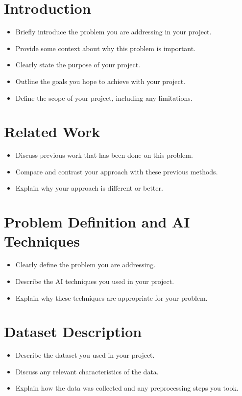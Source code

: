 \documentclass{article}
\begin{document}
\section{Introduction}
\begin{itemize}
    \item Briefly introduce the problem you are addressing in your project.
    \item Provide some context about why this problem is important.
    \item Clearly state the purpose of your project.
    \item Outline the goals you hope to achieve with your project.
    \item Define the scope of your project, including any limitations.
\end{itemize}

\section{Related Work}
\begin{itemize}
    \item Discuss previous work that has been done on this problem.
    \item Compare and contrast your approach with these previous methods.
    \item Explain why your approach is different or better.
\end{itemize}

\section{Problem Definition and AI Techniques}
\begin{itemize}
    \item Clearly define the problem you are addressing.
    \item Describe the AI techniques you used in your project.
    \item Explain why these techniques are appropriate for your problem.
\end{itemize}

\section{Dataset Description}
\begin{itemize}
    \item Describe the dataset you used in your project.
    \item Discuss any relevant characteristics of the data.
    \item Explain how the data was collected and any preprocessing steps you took.
\end{itemize}
\end{document}
